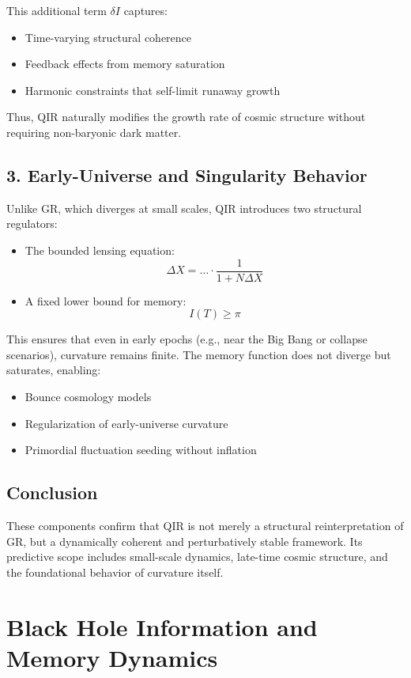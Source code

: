 \documentclass[11pt]{article}
\begin{document}
This additional term $\delta I$ captures:
\begin{itemize}
  \item Time-varying structural coherence
  \item Feedback effects from memory saturation
  \item Harmonic constraints that self-limit runaway growth
\end{itemize}

Thus, QIR naturally modifies the growth rate of cosmic structure without requiring non-baryonic dark matter.

\subsection*{3. Early-Universe and Singularity Behavior}

Unlike GR, which diverges at small scales, QIR introduces two structural regulators:
\begin{itemize}
  \item The bounded lensing equation: \[ \Delta X = \dots \cdot \frac{1}{1 + N \Delta X} \]
  \item A fixed lower bound for memory: \[ I(T) \geq \pi \]
\end{itemize}

This ensures that even in early epochs (e.g., near the Big Bang or collapse scenarios), curvature remains finite. The memory function does not diverge but saturates, enabling:
\begin{itemize}
  \item Bounce cosmology models
  \item Regularization of early-universe curvature
  \item Primordial fluctuation seeding without inflation
\end{itemize}

\subsection*{Conclusion}

These components confirm that QIR is not merely a structural reinterpretation of GR, but a dynamically coherent and perturbatively stable framework. Its predictive scope includes small-scale dynamics, late-time cosmic structure, and the foundational behavior of curvature itself.


\section{Black Hole Information and Memory Dynamics}
\end{document}
